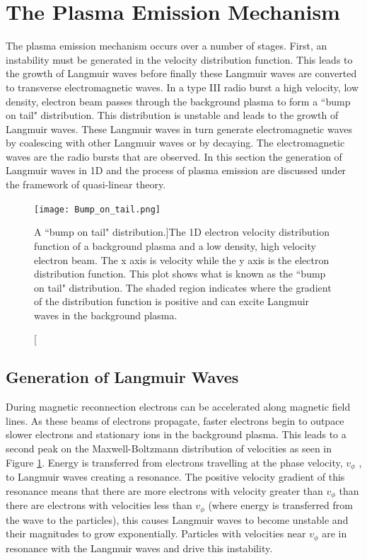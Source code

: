 \section{The Plasma Emission Mechanism}
\label{sec:plasma_emission}
The plasma emission mechanism occurs over a number of stages. First, an instability must be generated in the velocity distribution function. This leads to the growth of Langmuir waves before finally these Langmuir waves are converted to transverse electromagnetic waves. In a type III radio burst a high velocity, low density, electron beam passes through the background plasma to form a ``bump on tail" distribution. This distribution is unstable and leads to the growth of Langmuir waves. These Langmuir waves in turn generate electromagnetic waves by coalescing with other Langmuir waves or by decaying. The electromagnetic waves are the radio bursts that are observed. In this section the generation of Langmuir waves in 1D and the process of plasma emission are discussed under the framework of quasi-linear theory.

\begin{figure}[ht]
\centering
\texttt{[image: Bump\_on\_tail.png]}
\caption[A ``bump on tail" distribution.]{The 1D electron velocity distribution function of a background plasma and a low density, high velocity electron beam. The x axis is velocity while the y axis is the electron distribution function. This plot shows what is known as the ``bump on tail" distribution. The shaded region indicates where the gradient of the distribution function is positive and can excite Langmuir waves in the background plasma.}
\label{fig:bumpontail}
\end{figure}

\subsection{Generation of Langmuir Waves}
During magnetic reconnection electrons can be accelerated along magnetic field lines. As these beams of electrons propagate, faster electrons begin to outpace slower electrons and stationary ions in the background plasma. This leads to a second peak on the Maxwell-Boltzmann distribution of velocities as seen in Figure \ref{fig:bumpontail}. Energy is transferred from electrons travelling at the phase velocity, $v_{\phi}$ , to Langmuir waves creating a resonance.
The positive velocity gradient of this resonance means that there are more electrons with velocity greater than $v_{\phi}$ than there are electrons with velocities less than  $v_{\phi}$ (where energy is transferred from the wave to the particles), this causes Langmuir waves to become unstable and their magnitudes to grow exponentially. Particles with velocities near $v_{\phi}$ are in resonance with the Langmuir waves and drive this instability.

